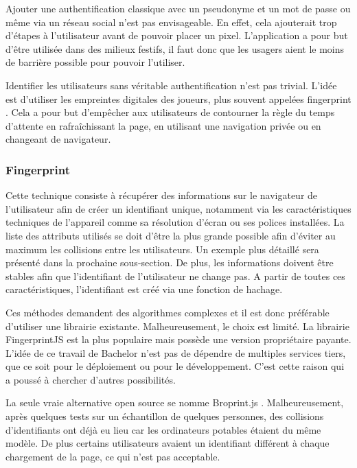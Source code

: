 Ajouter une authentification classique avec un pseudonyme et un mot de passe ou même via un réseau social n'est pas envisageable. En effet, cela ajouterait trop d'étapes à l'utilisateur avant de pouvoir placer un pixel. L'application a pour but d'être utilisée dans des milieux festifs, il faut donc que les usagers aient le moins de barrière possible pour pouvoir l'utiliser.

Identifier les utilisateurs sans véritable authentification n'est pas trivial. L'idée est d'utiliser les empreintes digitales des joueurs, plus souvent appelées fingerprint \cite{devicefingerprint}. Cela a pour but d'empêcher aux utilisateurs de contourner la règle du temps d'attente en rafraîchissant la page, en utilisant une navigation privée ou en changeant de navigateur.

\subsubsection{Fingerprint}

Cette technique consiste à récupérer des informations sur le navigateur de l'utilisateur afin de créer un identifiant unique, notamment via les caractéristiques techniques de l'appareil comme sa résolution d'écran ou ses polices installées. La liste des attributs utilisés se doit d'être la plus grande possible afin d'éviter au maximum les collisions entre les utilisateurs. Un exemple plus détaillé sera présenté dans la prochaine sous-section. De plus, les informations doivent être stables afin que l'identifiant de l'utilisateur ne change pas. A partir de toutes ces caractéristiques, l'identifiant est créé via une fonction de hachage.

Ces méthodes demandent des algorithmes complexes et il est donc préférable d'utiliser une librairie existante. Malheureusement, le choix est limité. La librairie FingerprintJS \cite{fingerprintjs} est la plus populaire mais possède une version propriétaire payante. L'idée de ce travail de Bachelor n'est pas de dépendre de multiples services tiers, que ce soit pour le déploiement ou pour le développement. C'est cette raison qui a poussé à chercher d'autres possibilités.

La seule vraie alternative open source se nomme Broprint.js \cite{broprintjs}. Malheureusement, après quelques tests sur un échantillon de quelques personnes, des collisions d'identifiants ont déjà eu lieu car les ordinateurs potables étaient du même modèle. De plus certains utilisateurs avaient un identifiant différent à chaque chargement de la page, ce qui n'est pas acceptable.

